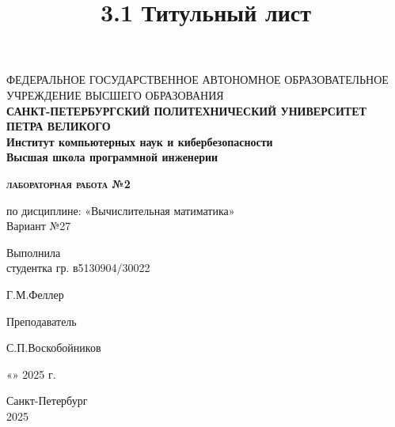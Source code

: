 \documentclass[a4paper,14pt]{article}
\title{3.1 Титульный лист}
\begin{document}
\thispagestyle{empty}    %

\begin{center}
    ФЕДЕРАЛЬНОЕ ГОСУДАРСТВЕННОЕ АВТОНОМНОЕ ОБРАЗОВАТЕЛЬНОЕ УЧРЕЖДЕНИЕ ВЫСШЕГО ОБРАЗОВАНИЯ\\
    \bfseries{САНКТ-ПЕТЕРБУРГСКИЙ ПОЛИТЕХНИЧЕСКИЙ УНИВЕРСИТЕТ ПЕТРА ВЕЛИКОГО}\\
    Институт компьютерных наук и кибербезопасности\\
    Высшая школа программной инженерии
\end{center}

\vspace{20ex} %

\begin{center}
    \begin{huge} {\bfseries{\scshape лабораторная работа №2}} \end{huge}

    \vspace{3ex}
    по дисциплине: «Вычислительная матиматика»\\
    Вариант №27
\end{center}

\vspace{30ex}

\noindent Выполнила\\
студентка гр. в5130904/30022\hfill \begin{minipage}{0.6\textwidth} \hfill Г.М.Феллер\end{minipage}

\vspace{3ex}

\noindent Преподаватель \hfill \begin{minipage} {0.6\textwidth}\hfill С.П.Воскобойников\end{minipage}

\vspace{3ex}

\hfill \begin{minipage}{0.6\textwidth} \hfill «\underline{\hspace{1cm}}»\underline{\hspace{3cm}} 2025 г.\end{minipage}

\vfill

\begin{center}
    Санкт-Петербург\\ 
    2025
\end{center}
\end{document}
